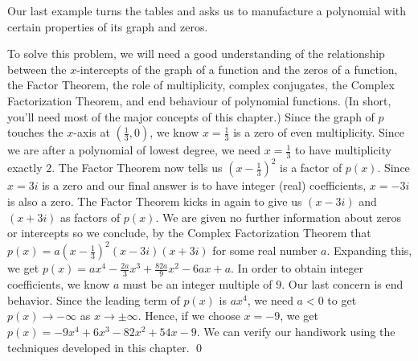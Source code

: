 \medskip

Our last example turns the tables and asks us to manufacture a polynomial with certain properties of its graph and zeros.

\medskip

{
 To solve this problem, we will need a good understanding of the relationship between the $x$-intercepts of the graph of a function and the zeros of a function, the Factor Theorem, the role of multiplicity, complex conjugates, the Complex Factorization Theorem, and end behaviour of polynomial functions.  (In short, you'll need most of the major concepts of this chapter.)  Since the graph of $p$ touches the $x$-axis at $\left(\frac{1}{3}, 0\right)$, we know $x=\frac{1}{3}$ is a zero of even multiplicity.  Since we are after a polynomial of lowest degree, we need $x=\frac{1}{3}$ to have multiplicity exactly $2$. The Factor Theorem now tells us  $\left(x-\frac{1}{3}\right)^2$ is a factor of $p(x)$.  Since $x=3i$ is a zero and our final answer is to have integer (real) coefficients, $x=-3i$ is also a zero.  The Factor Theorem kicks in again to give us $(x-3i)$ and $(x+3i)$ as factors of $p(x)$.  We are given no further information about zeros or intercepts so we conclude, by the Complex Factorization Theorem that $p(x) = a \left(x-\frac{1}{3}\right)^2 (x-3i)(x+3i)$ for some real number $a$.  Expanding this, we get $p(x) =  ax^4-\frac{2a}{3} x^3+\frac{82a}{9} x^2-6ax+a$.  In order to obtain integer coefficients, we know $a$ must be an integer multiple of $9$.  Our last concern is end behavior.  Since the leading term of $p(x)$ is $ax^4$, we need $a < 0$ to get $p(x) \rightarrow -\infty$ as $x \rightarrow \pm \infty$. Hence, if we choose $x=-9$, we get $p(x) = -9x^4+ 6 x^3 - 82 x^2+54x-9$.    We can verify our handiwork using the techniques developed in this chapter.  \qed
}

